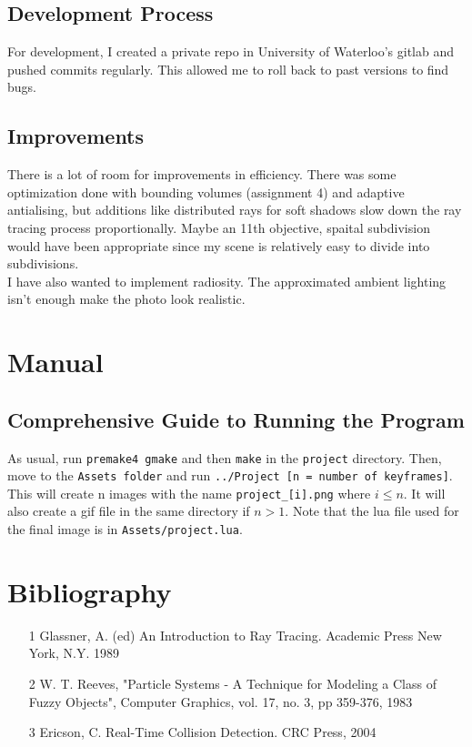 \documentclass{article}
\begin{document}
\subsection{Development Process}
For development, I created a private repo in University of Waterloo's gitlab and pushed commits regularly. This allowed me to roll back to past versions to find bugs.

\subsection{Improvements}
There is a lot of room for improvements in efficiency. There was some optimization done with bounding volumes (assignment 4) and adaptive antialising, but additions like distributed rays for soft shadows slow down the ray tracing process proportionally. Maybe an 11th objective, spaital subdivision would have been appropriate since my scene is relatively easy to divide into subdivisions. \\

I have also wanted to implement radiosity. The approximated ambient lighting isn't enough make the photo look realistic.
\section{Manual}
\subsection{Comprehensive Guide to Running the Program}
As usual, run \texttt{premake4 gmake} and then \texttt{make} in the \texttt{project} directory. Then, move to the \texttt{Assets folder} and run \texttt{../Project [n = number of keyframes]}. This will create n images with the name \texttt{project\_[i].png} where $i \leq n$. It will also create a gif file in the same directory if $n > 1$. Note that the lua file used for the final image is in \texttt{Assets/project.lua}.

\section{Bibliography}
\begin{itemize}
  \item [1] Glassner, A. (ed) An Introduction to Ray Tracing. Academic Press New York, N.Y. 1989
  \item [2] W. T. Reeves, "Particle Systems - A Technique for Modeling a Class of Fuzzy Objects", Computer Graphics, vol. 17, no. 3, pp 359-376, 1983
  \item [3] Ericson, C. Real-Time Collision Detection. CRC Press, 2004
\end{itemize}
\end{document}
